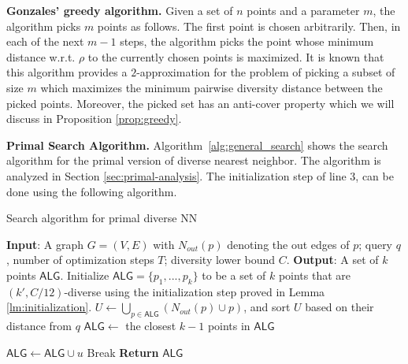 \noindent\textbf{Gonzales' greedy algorithm.} Given a set of $n$ points and a parameter $m$, the algorithm picks $m$ points as follows. The first point is chosen arbitrarily. Then, in each of the next $m-1$ steps, the algorithm picks the point whose minimum distance w.r.t. $\rho$ to the currently chosen points is maximized. It is known \cite{gonzalez1985clustering} that this algorithm provides a $2$-approximation for the problem of picking a subset of size $m$ which maximizes the minimum pairwise diversity distance between the picked points. Moreover, the picked set has an anti-cover property which we will discuss in Proposition \ref{prop:greedy}.

\noindent\textbf{Primal Search Algorithm.} Algorithm~\ref{alg:general_search} shows the search algorithm for the primal version of diverse nearest neighbor. 
The algorithm is analyzed in Section \ref{sec:primal-analysis}. The initialization step of line 3, can be done using the following algorithm.


\begin{algorithm}
\caption{Search algorithm for primal diverse NN}
\label{alg:general_search}

\begin{algorithmic}[1]
\STATE \textbf{Input}: A graph $G=(V,E)$ with $N_{out}(p)$ denoting the out edges of $p$; query $q$, number of optimization steps $T$; diversity lower bound $C$.
\STATE \textbf{Output}: A set of $k$ points $\mathsf{ALG}$.
\STATE Initialize $\mathsf{ALG}=\{p_1,...,p_k\}$ to be a set of $k$ points that are $(k',C/12)$-diverse using the initialization step proved in Lemma \ref{lm:initialization}.
    \STATE $U\gets \bigcup\limits_{p\in \mathsf{ALG}}(N_{out}(p)\cup p)$, and sort $U$ based on their distance from $q$
        \STATE $\mathsf{ALG}\gets$ the closest $k-1$ points in $\mathsf{ALG}$
    
            \STATE $\mathsf{ALG}\gets \mathsf{ALG}\cup u$
        \ENDIF
            \STATE Break
        \ENDIF
    \ENDFOR
\ENDFOR
\STATE \textbf{Return} $\mathsf{ALG}$
\end{algorithmic}
\end{algorithm}

